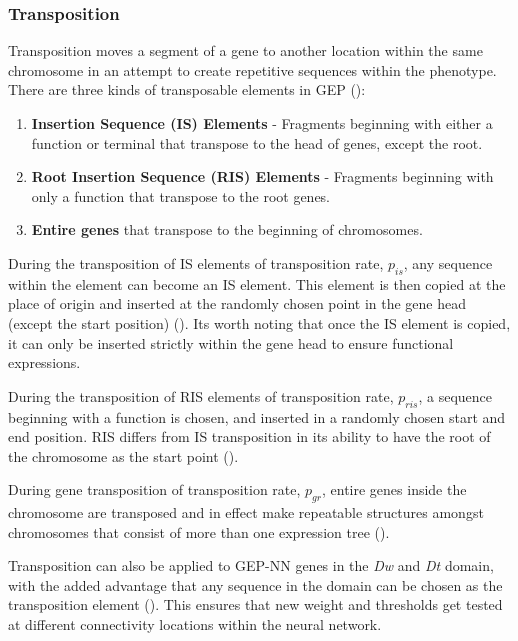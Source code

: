 \subsubsection{Transposition}
Transposition moves a segment of a gene to another location within the same chromosome in an attempt to create repetitive sequences within the phenotype. There are three kinds of transposable elements in GEP (\cite{ferreira2006gene}):

\begin{enumerate}
    \item \textbf{Insertion Sequence (IS) Elements} - Fragments beginning with either a function or terminal that transpose to the head of genes, except the root.
    \item \textbf{Root Insertion Sequence (RIS) Elements} - Fragments beginning with only a function that transpose to the root genes.
    \item \textbf{Entire genes} that transpose to the beginning of chromosomes.
\end{enumerate}

\parbreak\noindent During the transposition of IS elements of transposition rate, \textit{$p_{is}$}, any sequence within the element can become an IS element. This element is then copied at the place of origin and inserted at the randomly chosen point in the gene head (except the start position) (\cite{ferreira2006gene}). Its worth noting that once the IS element is copied, it can only be inserted strictly within the gene head to ensure functional expressions.

\parbreak\noindent During the transposition of RIS elements of transposition rate, \textit{$p_{ris}$}, a sequence beginning with a function is chosen, and inserted in a randomly chosen start and end position. RIS differs from IS transposition in its ability to have the root of the chromosome as the start point (\Cite{ferreira2006gene}).

\parbreak\noindent During gene transposition of transposition rate, \textit{$p_{gr}$}, entire genes inside the chromosome are transposed and in effect make repeatable structures amongst chromosomes that consist of more than one expression tree (\cite{ferreira2006gene}).

\parbreak\noindent Transposition can also be applied to GEP-NN genes in the \textit{Dw} and \textit{Dt} domain, with the added advantage that any sequence in the domain can be chosen as the transposition element (\cite{ferreira2006gene}). This ensures that new weight and thresholds get tested at different connectivity locations within the neural network.

